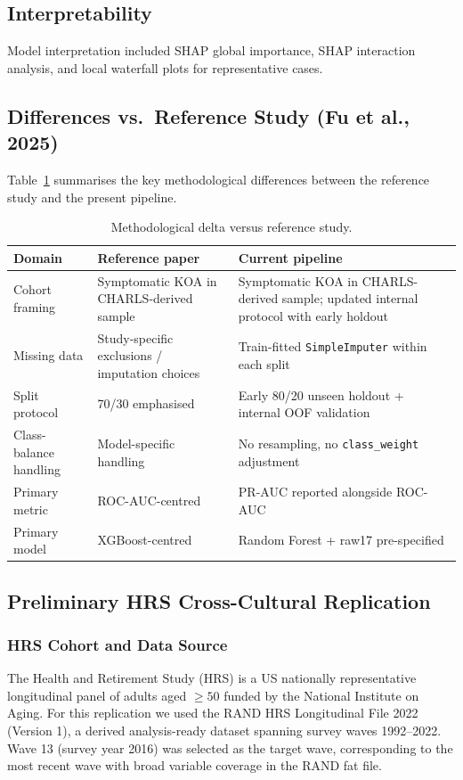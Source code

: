 \documentclass[11pt,a4paper]{article}
\begin{document}
\subsection{Interpretability}
Model interpretation included SHAP global importance\cite{Lundberg2017}, SHAP interaction analysis,
and local waterfall plots for representative cases.

\subsection{Differences vs.\ Reference Study (Fu et al., 2025)}
Table~\ref{tab:paper-delta} summarises the key methodological differences between the reference
study and the present pipeline.

\begin{table}[h!]
\centering
\caption{Methodological delta versus reference study.}
\label{tab:paper-delta}
\begin{tabular}{p{3.4cm}p{5.1cm}p{5.1cm}}
\toprule
Domain & Reference paper & Current pipeline \\
\midrule
Cohort framing & Symptomatic KOA in CHARLS-derived sample &
  Symptomatic KOA in CHARLS-derived sample; updated internal protocol with early holdout \\
Missing data & Study-specific exclusions / imputation choices &
  Train-fitted \texttt{SimpleImputer} within each split \\
Split protocol & 70/30 emphasised & Early 80/20 unseen holdout + internal OOF validation \\
Class-balance handling & Model-specific handling &
  No resampling, no \texttt{class\_weight} adjustment \\
Primary metric & ROC-AUC-centred & PR-AUC reported alongside ROC-AUC \\
Primary model & XGBoost-centred & Random Forest + raw17 pre-specified \\
\bottomrule
\end{tabular}
\end{table}

\subsection{Preliminary HRS Cross-Cultural Replication}

\subsubsection*{HRS Cohort and Data Source}
The Health and Retirement Study (HRS)\cite{HRS2023} is a US nationally representative longitudinal
panel of adults aged $\geq 50$ funded by the National Institute on Aging. For this replication we used
the RAND HRS Longitudinal File 2022 (Version 1)\cite{RAND2023}, a derived analysis-ready dataset
spanning survey waves 1992--2022. Wave 13 (survey year 2016) was selected as the target wave,
corresponding to the most recent wave with broad variable coverage in the RAND fat file.
\end{document}
